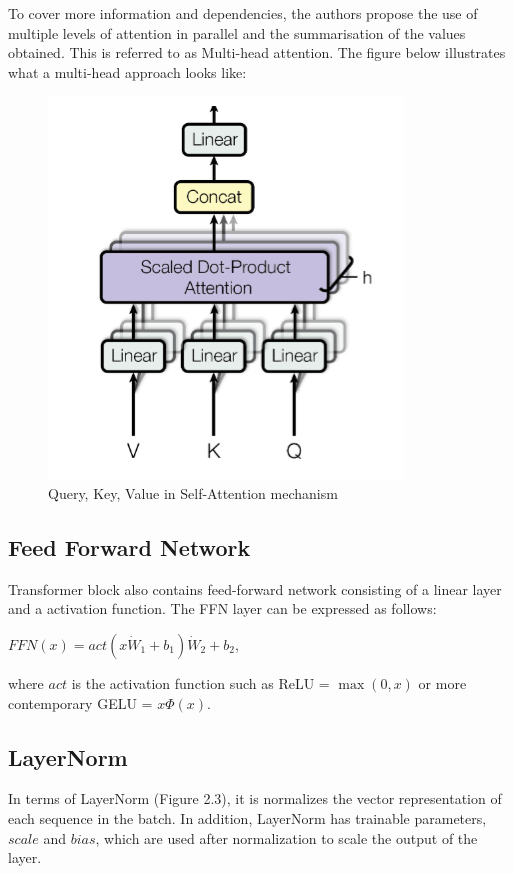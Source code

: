 \documentclass[PMI,VKR]{HSEUniversity}
\begin{document}
To cover more information and dependencies, the authors propose the use of multiple levels of attention in parallel and the summarisation of the values obtained. 
This is referred to as Multi-head attention. The figure below illustrates what a multi-head approach looks like:

\begin{figure}[h]
    \centering
    \includegraphics[scale=0.7]{img/multi-head.png}
    \caption{Query, Key, Value in Self-Attention mechanism}
\end{figure}

\subsection{Feed Forward Network}

Transformer block also contains feed-forward network consisting of a linear layer and a activation function.
The FFN layer can be expressed as follows:
\begin{center}
    $FFN(x) = act(x \dot W_{1} + b_{1}) \dot W_{2} + b_{2}$, \\    
\end{center}
where $act$ is the activation function such as ReLU = $\max(0, x)$ or more contemporary GELU = $x\Phi(x)$.

\subsection{LayerNorm}

In terms of LayerNorm (Figure 2.3), it is normalizes the vector representation of each sequence in the batch. 
In addition, LayerNorm has trainable parameters, $scale$ and $bias$, which are used after normalization to scale the output of the layer.
\end{document}
